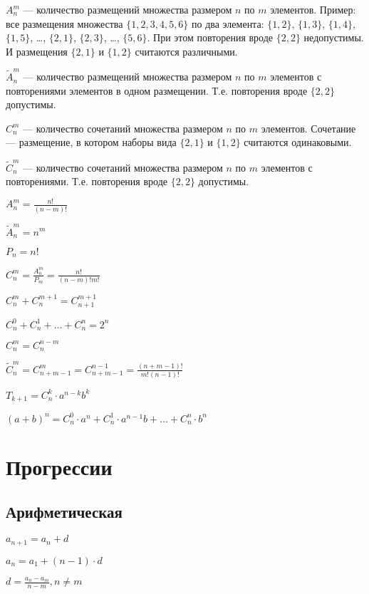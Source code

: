 $ A^m_n $ --- количество размещений множества размером $ n $ по $ m $ элементов. Пример: все размещения множества $ \{1, 2, 3, 4, 5, 6 \} $ по два элемента: $ \{1, 2\} $, $ \{1, 3\} $, $ \{1, 4\} $, $ \{1, 5\} $, \dots, $ \{2, 1\} $, $ \{2, 3\} $,  \dots, $ \{5, 6\} $. При этом повторения вроде $ \{2, 2\} $ недопустимы. И размещения $ \{2, 1 \} $ и $ \{ 1, 2 \} $ считаются различными.

$ \widetilde{A}^m_n $ --- количество размещений множества размером $ n $ по $ m $ элементов с повторениями элементов в одном размещении. Т.е. повторения вроде $ \{2, 2\} $ допустимы.

$ C^m_n $ --- количество сочетаний множества размером $n$ по $m$ элементов. Сочетание --- размещение, в котором наборы вида $ \{2, 1 \} $ и $ \{ 1, 2 \} $ считаются одинаковыми.

$ \widetilde{C}^m_n $ --- количество сочетаний множества размером $n$ по $m$ элементов с повторениями. Т.е. повторения вроде $ \{2, 2\} $ допустимы.

$ A^m_n = \frac{n!}{(n-m)!} $

$ \widetilde{A}^m_n = n^m $

$ P_n = n! $

$ C^m_n = \frac{A^m_n}{P_m} = \frac{n!}{(n-m)!m!} $

$ C^m_n + C^{m+1}_n = C^{m+1}_{n+1} $

$ C^0_n + C^1_n + \dots + C^n_n = 2^n $

$ C^m_n = C^{n-m}_n $

$ \widetilde{C}^m_n = C^m_{n+m-1} = C^{n-1}_{n+m-1} = \frac{(n+m-1)!}{m!(n-1)!} $

$ T_{k+1} = C^k_n\cdot a^{n-k}b^k $

$ (a+b)^n = C^0_n\cdot a^n + C^1_n\cdot a^{n-1}b + \dots + C^n_n\cdot b^n $

	
\section{Прогрессии}

\subsection{Арифметическая}

$ a_{n+1} = a_n + d $

$ a_n = a_1 + (n-1)\cdot d $

$ d = \frac{a_n-a_m}{n-m}, n \neq m $

